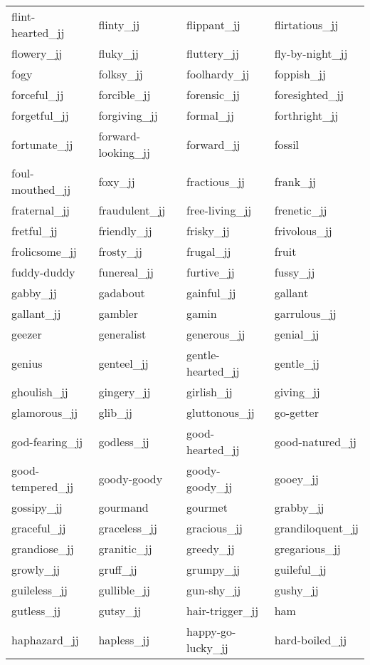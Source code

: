 \begin{longtable}[tbp]{| llll |}
   flint-hearted\_jj & flinty\_jj & flippant\_jj & flirtatious\_jj \\
   flowery\_jj & fluky\_jj & fluttery\_jj & fly-by-night\_jj \\
   fogy & folksy\_jj & foolhardy\_jj & foppish\_jj \\
   forceful\_jj & forcible\_jj & forensic\_jj & foresighted\_jj \\
   forgetful\_jj & forgiving\_jj & formal\_jj & forthright\_jj \\
   fortunate\_jj & forward-looking\_jj & forward\_jj & fossil \\
   foul-mouthed\_jj & foxy\_jj & fractious\_jj & frank\_jj \\
   fraternal\_jj & fraudulent\_jj & free-living\_jj & frenetic\_jj \\
   fretful\_jj & friendly\_jj & frisky\_jj & frivolous\_jj \\
   frolicsome\_jj & frosty\_jj & frugal\_jj & fruit \\
   fuddy-duddy & funereal\_jj & furtive\_jj & fussy\_jj \\
   gabby\_jj & gadabout & gainful\_jj & gallant \\
   gallant\_jj & gambler & gamin & garrulous\_jj \\
   geezer & generalist & generous\_jj & genial\_jj \\
   genius & genteel\_jj & gentle-hearted\_jj & gentle\_jj \\
   ghoulish\_jj & gingery\_jj & girlish\_jj & giving\_jj \\
   glamorous\_jj & glib\_jj & gluttonous\_jj & go-getter \\
   god-fearing\_jj & godless\_jj & good-hearted\_jj & good-natured\_jj \\
   good-tempered\_jj & goody-goody & goody-goody\_jj & gooey\_jj \\
   gossipy\_jj & gourmand & gourmet & grabby\_jj \\
   graceful\_jj & graceless\_jj & gracious\_jj & grandiloquent\_jj \\
   grandiose\_jj & granitic\_jj & greedy\_jj & gregarious\_jj \\
   growly\_jj & gruff\_jj & grumpy\_jj & guileful\_jj \\
   guileless\_jj & gullible\_jj & gun-shy\_jj & gushy\_jj \\
   gutless\_jj & gutsy\_jj & hair-trigger\_jj & ham \\
   haphazard\_jj & hapless\_jj & happy-go-lucky\_jj & hard-boiled\_jj \\

\end{longtable}
